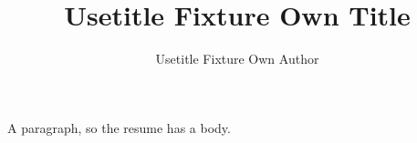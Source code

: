 \documentclass{careerdossier-resume}
\title{Usetitle Fixture Own Title}
\author{Usetitle Fixture Own Author}
\begin{document}
\MakeCDossierHeader
{}
A paragraph, so the resume has a body.
\end{document}
